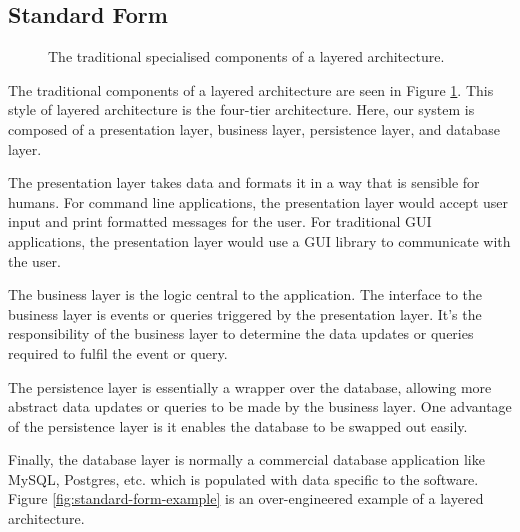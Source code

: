 
\subsection{Standard Form}

\begin{figure}[ht]
\centering
{}
\caption{The traditional specialised components of a layered architecture.}
\label{fig:traditional-layered}
\end{figure}

The traditional components of a layered architecture are seen in Figure \ref{fig:traditional-layered}.
This style of layered architecture is the four-tier architecture.
Here, our system is composed of a presentation layer, business layer, persistence layer, and database layer.

The presentation layer takes data and formats it in a way that is sensible for humans.
For command line applications, the presentation layer would accept user input and print formatted messages for the user.
For traditional GUI applications, the presentation layer would use a GUI library to communicate with the user.

The business layer is the logic central to the application.
The interface to the business layer is events or queries triggered by the presentation layer.
It's the responsibility of the business layer to determine the data updates or queries required to fulfil the event or query.

The persistence layer is essentially a wrapper over the database,
allowing more abstract data updates or queries to be made by the business layer.
One advantage of the persistence layer is it enables the database to be swapped out easily.

Finally, the database layer is normally a commercial database application like MySQL, Postgres, etc.
which is populated with data specific to the software.
Figure \ref{fig:standard-form-example} is an over-engineered example of a layered architecture.

